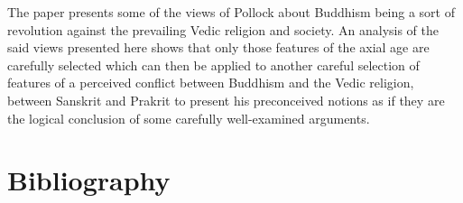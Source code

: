 The paper presents some of the views of Pollock about Buddhism being a sort of revolution against the prevailing Vedic religion and society. An analysis of the said views presented here shows that only those features of the axial age are carefully selected which can then be applied to another careful selection of features of a perceived conflict between Buddhism and the Vedic religion, between Sanskrit and Prakrit to present his preconceived notions as if they are the logical conclusion of some carefully well-examined arguments.

\vspace{-.3cm}

\section*{Bibliography}

